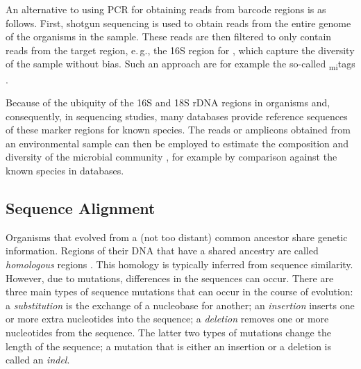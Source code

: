 An alternative to using PCR for obtaining reads from barcode regions is as follows.
First, shotgun sequencing is used to obtain reads from the entire genome of the organisms in the sample.
These reads are then filtered to only contain reads from the target region, e.\,g., the 16S region for ,
which capture the diversity of the sample without bias.
Such an approach are for example the so-called \textsubscript{mi}tags \cite{Logares2014}.

Because of the ubiquity of the 16S and 18S rDNA regions in organisms and, consequently, in sequencing studies,
many databases provide reference sequences of these marker regions for known species.
The reads or amplicons obtained from an environmental sample can then be employed
to estimate the composition and diversity of the microbial community \cite{Peabody2015,Hugerth2017},
for example by comparison against the known species in databases.



\subsection{Sequence Alignment}
\label{ch:Foundations:sec:SequenceAnalysis:sub:SequenceAlignment}

Organisms that evolved from a (not too distant) common ancestor share genetic information.
Regions of their \ac{DNA} that have a shared ancestry are called \emph{homologous} regions \cite{Koonin2005}.
This homology is typically inferred from sequence similarity. %
However, due to mutations, differences in the sequences can occur.
There are three main types of sequence mutations that can occur in the course of evolution:
a \emph{substitution} is the exchange of a nucleobase for another;
an \emph{insertion} inserts one or more extra nucleotides into the sequence;
a \emph{deletion} removes one or more nucleotides from the sequence.
The latter two types of mutations change the length of the sequence;
a mutation that is either an insertion or a deletion is called an \emph{indel}.

